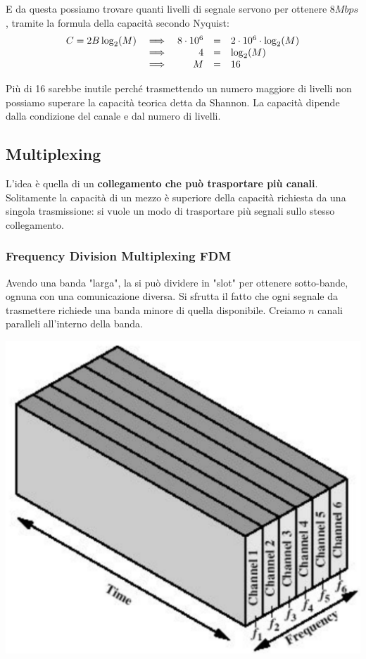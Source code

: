 E da questa possiamo trovare quanti livelli di segnale servono per ottenere $8Mbps$, tramite la formula della capacità secondo Nyquist:
$$\begin{array}{c c r c l}
	C = 2B \log_2 (M) & \implies & 8 \cdot 10^6 &=& 2 \cdot 10^6 \cdot \log_2(M) \\
	& \implies & 4 &=& \log_2 (M)  \\
	& \implies & M &=& 16 \\
\end{array}$$

Più di 16 sarebbe inutile perché trasmettendo un numero maggiore di livelli non possiamo superare la capacità teorica detta da Shannon. La capacità dipende dalla condizione del canale e dal numero di livelli.

\subsection{Multiplexing}

L'idea è quella di un \textbf{collegamento che può trasportare più canali}. Solitamente la capacità di un mezzo è superiore della capacità richiesta da una singola trasmissione: si vuole un modo di trasportare più segnali sullo stesso collegamento.

\subsubsection{Frequency Division Multiplexing FDM}

Avendo una banda "larga", la si può dividere in "slot" per ottenere sotto-bande, ognuna con una comunicazione diversa. Si sfrutta il fatto che ogni segnale da trasmettere richiede una banda minore di quella disponibile. Creiamo $n$ canali paralleli all'interno della banda.

\begin{center}
	\includegraphics[width=0.4\linewidth]{img/PTT/fdm1}
\end{center}

